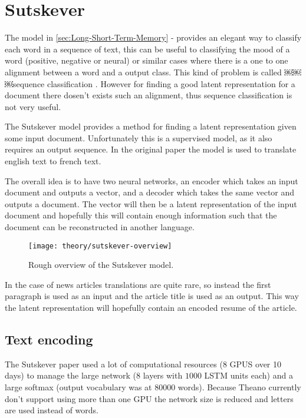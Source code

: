 
\section{Sutskever}

The model in \autoref{sec:Long-Short-Term-Memory} -  provides an elegant way to classify each word in a sequence of text, this can be useful to classifying the mood of a word (positive, negative or neural) or similar cases where there is a one to one alignment between a word and a output class. This kind of problem is called ￼￼￼sequence classification \cite[p.~10]{alexgraves}. However for finding a good latent representation for a document there dosen't exists such an alignment, thus sequence classification is not very useful.

The Sutskever model provides a method for finding a latent representation given some input document. Unfortunately this is a supervised model, as it also requires an output sequence. In the original paper \cite{sutskever} the model is used to translate english text to french text.

The overall idea is to have two neural networks, an encoder which takes an input document and outputs a vector, and a decoder which takes the same vector and outputs a document. The vector will then be a latent representation of the input document and hopefully this will contain enough information such that the document can be reconstructed in another language.

\begin{figure}[H]
	\centering
	\texttt{[image: theory/sutskever-overview]}
	\caption{Rough overview of the Sutskever model.}
\end{figure}

In the case of news articles translations are quite rare, so instead the first paragraph is used as an input and the article title is used as an output. This way the latent representation will hopefully contain an encoded resume of the article.

\subsection{Text encoding}

The Sutskever paper \cite{sutskever} used a lot of computational resources (8 GPUS over 10 days) to manage the large network (8 layers with $1000$ LSTM units each) and a large softmax (output vocabulary was at 80000 words). Because Theano currently don't support using more than one GPU the network size is reduced and letters are used instead of words.

